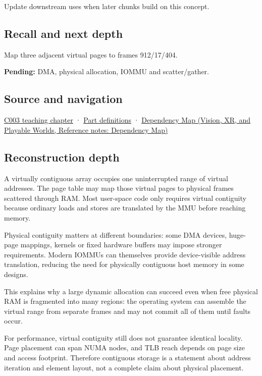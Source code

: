 Update downstream uses when later chunks build on this concept.

\subsection{Recall and next depth}\label{appendix-f897c1ddac8f-recall-and-next-depth}

\hypertarget{appendix-f897c1ddac8f-recall-and-next-depth}{}

Map three adjacent virtual pages to frames 912/17/404.

\textbf{Pending:} DMA, physical allocation, IOMMU and scatter/gather.

\subsection{Source and navigation}\label{appendix-f897c1ddac8f-source-and-navigation}

\hypertarget{appendix-f897c1ddac8f-source-and-navigation}{}

\hyperref[01-foundations-i-ch002-where-the-bytes-live]{C003 teaching chapter} · \hyperref[appendix-fd090d982a15-m003---parts-41-60]{Part definitions} · \href{../07-Vision-XR-and-Playable-Worlds/main.pdf\#nameddest=appendix-4ad47bdd269a}{Dependency Map (Vision, XR, and Playable Worlds, Reference notes: Dependency Map)}

\subsection{Reconstruction depth}\label{appendix-f897c1ddac8f-reconstruction-depth}

\hypertarget{appendix-f897c1ddac8f-reconstruction-depth}{}

A virtually contiguous array occupies one uninterrupted range of virtual addresses. The page table may map those virtual pages to physical frames scattered through RAM. Most user-space code only requires virtual contiguity because ordinary loads and stores are translated by the MMU before reaching memory.

Physical contiguity matters at different boundaries: some DMA devices, huge-page mappings, kernels or fixed hardware buffers may impose stronger requirements. Modern IOMMUs can themselves provide device-visible address translation, reducing the need for physically contiguous host memory in some designs.

This explains why a large dynamic allocation can succeed even when free physical RAM is fragmented into many regions: the operating system can assemble the virtual range from separate frames and may not commit all of them until faults occur.

For performance, virtual contiguity still does not guarantee identical locality. Page placement can span NUMA nodes, and TLB reach depends on page size and access footprint. Therefore contiguous storage is a statement about address iteration and element layout, not a complete claim about physical placement.
